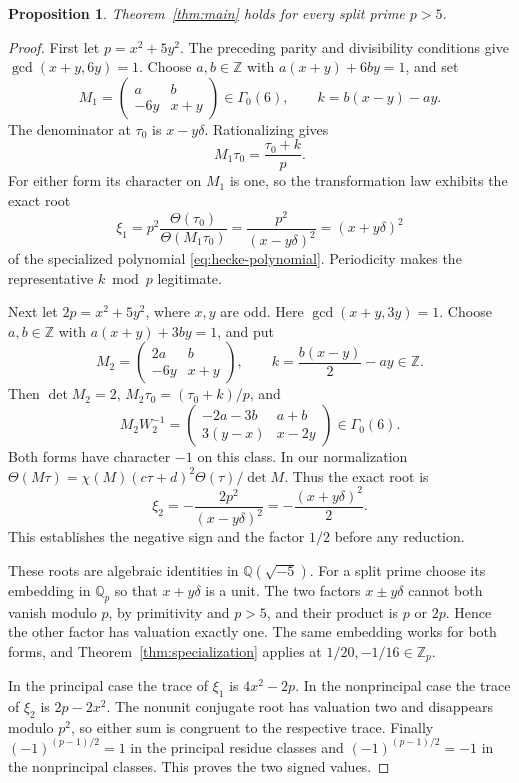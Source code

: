 \documentclass[11pt,a4paper]{article}
\newtheorem{proposition}[theorem]{Proposition}
\theoremstyle{remark}
\newcommand{\Z}{\mathbb Z}
\newcommand{\Q}{\mathbb Q}
\newcommand{\Zp}{\mathbb Z_p}
\newcommand{\smat}[4]{\begin{pmatrix}#1&#2\\#3&#4\end{pmatrix}}
\newcommand{\Gbase}{\Gamma_0(6)}
\begin{document}
\begin{proposition}\label{prop:split}
Theorem~\ref{thm:main} holds for every split prime $p>5$.
\end{proposition}
\begin{proof}
First let $p=x^2+5y^2$. The preceding parity and divisibility
conditions give $\gcd(x+y,6y)=1$. Choose $a,b\in\Z$ with
$a(x+y)+6by=1$, and set
\[
 M_1=\smat{a}{b}{-6y}{x+y}\in\Gbase,\qquad
 k=b(x-y)-ay.
\]
The denominator at $\tau_0$ is $x-y\delta$. Rationalizing gives
\[
 M_1\tau_0=\frac{\tau_0+k}{p}.
\]
For either form its character on $M_1$ is one, so the transformation
law exhibits the exact root
\begin{equation}\label{eq:principal-root}
 \xi_1=p^2\frac{\Theta(\tau_0)}{\Theta(M_1\tau_0)}
       =\frac{p^2}{(x-y\delta)^2}=(x+y\delta)^2
\end{equation}
of the specialized polynomial \eqref{eq:hecke-polynomial}.
Periodicity makes the representative $k\bmod p$ legitimate.

Next let $2p=x^2+5y^2$, where $x,y$ are odd. Here
$\gcd(x+y,3y)=1$. Choose $a,b\in\Z$ with
$a(x+y)+3by=1$, and put
\[
 M_2=\smat{2a}{b}{-6y}{x+y},\qquad
 k=\frac{b(x-y)}2-ay\in\Z.
\]
Then $\det M_2=2$, $M_2\tau_0=(\tau_0+k)/p$, and
\[
 M_2W_2^{-1}=\smat{-2a-3b}{a+b}{3(y-x)}{x-2y}\in\Gbase.
\]
Both forms have character $-1$ on this class. In our normalization
$\Theta(M\tau)=\chi(M)(c\tau+d)^2\Theta(\tau)/\det M$.
Thus the exact root is
\begin{equation}\label{eq:nonprincipal-root}
 \xi_2=-\frac{2p^2}{(x-y\delta)^2}
      =-\frac{(x+y\delta)^2}{2}.
\end{equation}
This establishes the negative sign and the factor $1/2$ before any
reduction.

These roots are algebraic identities in $\Q(\sqrt{-5})$.
For a split prime choose its embedding in $\Q_p$ so that
$x+y\delta$ is a unit. The two factors $x\pm y\delta$ cannot both
vanish modulo $p$, by primitivity and $p>5$, and their product is
$p$ or $2p$. Hence the other factor has valuation exactly one.
The same embedding works for both forms, and
Theorem~\ref{thm:specialization} applies at $1/20,-1/16\in\Zp$.

In the principal case the trace of $\xi_1$ is $4x^2-2p$.
In the nonprincipal case the trace of $\xi_2$ is $2p-2x^2$.
The nonunit conjugate root has valuation two and disappears modulo
$p^2$, so either sum is congruent to the respective trace.
Finally $(-1)^{(p-1)/2}=1$ in the principal residue classes and $(-1)^{(p-1)/2}=-1$
in the nonprincipal classes. This proves the two signed values.
\end{proof}
\end{document}
